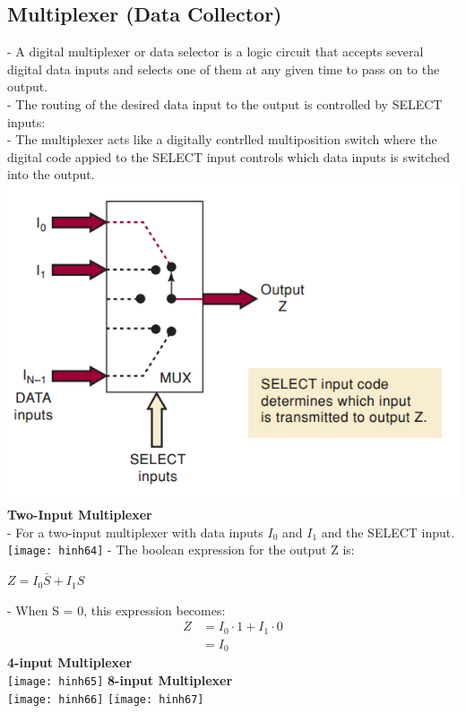 \documentclass[12pt]{article}
\begin{document}
\subsection{Multiplexer (Data Collector)}
- A digital multiplexer or data selector is a logic circuit that accepts several digital data inputs and selects one of them at any given time to pass on to the output. \\
- The routing of the desired data input to the output is controlled by SELECT inputs: \\
- The multiplexer acts like  a digitally contrlled multiposition switch where the digital code appied to the SELECT input controls which data inputs is switched into the output. \\
\includegraphics[scale = 0.7]{hinh63}
\bigbreak
\textbf{Two-Input Multiplexer} \\
- For a two-input multiplexer with data inputs $I_{0}$ and $I_1$ and the SELECT input. \\
\texttt{[image: hinh64]}
\bigbreak
- The boolean expression for the output Z is: \\
\begin{center}
    $Z = I_{0} \bar{S} + I_{1} S$
\end{center}
- When S = 0, this expression becomes: \\
\begin{align}
    Z &= I_{0} \cdot 1 + I_{1} \cdot 0 \\
    &= I_{0}
\end{align}
\bigbreak
\textbf{4-input Multiplexer} \\
\texttt{[image: hinh65]}
\bigbreak
\textbf{8-input Multiplexer} \\
\texttt{[image: hinh66]}
\bigbreak
\texttt{[image: hinh67]}
\bigbreak
\end{document}
